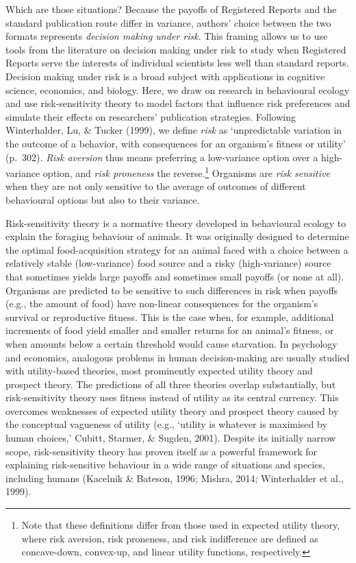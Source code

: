 \documentclass[
  ,man,mask,floatsintext]{apa6}
\begin{document}
Which are those situations?
Because the payoffs of Registered Reports and the standard publication route differ in variance, authors' choice between the two formats represents \emph{decision making under risk}.
This framing allows us to use tools from the literature on decision making under risk to study when Registered Reports serve the interests of individual scientists less well than standard reports.
Decision making under risk is a broad subject with applications in cognitive science, economics, and biology.
Here, we draw on research in behavioural ecology and use risk-sensitivity theory to model factors that influence risk preferences and simulate their effects on researchers' publication strategies.
Following Winterhalder, Lu, \& Tucker (1999), we define \emph{risk} as `unpredictable variation in the outcome of a behavior, with consequences for an organism's fitness or utility' (p.~302).
\emph{Risk aversion} thus means preferring a low-variance option over a high-variance option, and \emph{risk proneness} the reverse.\footnote{Note that these definitions differ from those used in expected utility theory, where risk aversion, risk proneness, and risk indifference are defined as concave-down, convex-up, and linear utility functions, respectively.}
Organisms are \emph{risk sensitive} when they are not only sensitive to the average of outcomes of different behavioural options but also to their variance.

Risk-sensitivity theory is a normative theory developed in behavioural ecology to explain the foraging behaviour of animals.
It was originally designed to determine the optimal food-acquisition strategy for an animal faced with a choice between a relatively stable (low-variance) food source and a risky (high-variance) source that sometimes yields large payoffs and sometimes small payoffs (or none at all).
Organisms are predicted to be sensitive to such differences in risk when payoffs (e.g., the amount of food) have non-linear consequences for the organism's survival or reproductive fitness.
This is the case when, for example, additional increments of food yield smaller and smaller returns for an animal's fitness, or when amounts below a certain threshold would cause starvation.
In psychology and economics, analogous problems in human decision-making are usually studied with utility-based theories, most prominently expected utility theory and prospect theory.
The predictions of all three theories overlap substantially, but risk-sensitivity theory uses fitness instead of utility as its central currency.
This overcomes weaknesses of expected utility theory and prospect theory caused by the conceptual vagueness of utility (e.g., `utility is whatever is maximised by human choices,' Cubitt, Starmer, \& Sugden, 2001).
Despite its initially narrow scope, risk-sensitivity theory has proven itself as a powerful framework for explaining risk-sensitive behaviour in a wide range of situations and species, including humans (Kacelnik \& Bateson, 1996; Mishra, 2014; Winterhalder et al., 1999).
\end{document}
